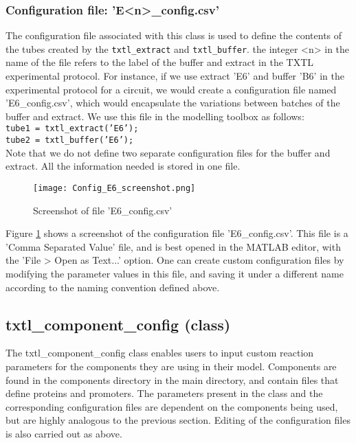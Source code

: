 		\subsubsection*{Configuration file: \textsf{'E<n>\_config.csv'}}
		The configuration file associated with this class is used to define the contents of the tubes created by the \texttt{txtl\_extract} and \texttt{txtl\_buffer}. the integer <n> in the name of the file refers to the label of the buffer and extract in the TXTL experimental protocol. For instance, if we use extract \textsf{'E6'} and buffer \textsf{'B6'} in the experimental protocol for a circuit, we would create a configuration file named \textsf{'E6\_config.csv'}, which would encapsulate the variations between batches of the buffer and extract.  We use this file in the modelling toolbox as follows: \\
		
		\noindent \texttt{tube1 = txtl\_extract('E6');} \\
		\texttt{tube2 = txtl\_buffer('E6');} \\
		
Note that we do not define two separate configuration files for the buffer and extract. All the information needed is stored in one file. \\

		\begin{figure}
		\begin{center}
		\texttt{[image: Config\_E6\_screenshot.png]} 
		\caption{Screenshot of file 'E6\_config.csv'}
		\label{fig:reactionconfig}
		\end{center}
		\end{figure}

Figure \ref{fig:reactionconfig} shows a screenshot of the configuration file \textsf{'E6\_config.csv'}. This file is a 'Comma Separated Value' file, and is best opened in the MATLAB editor, with the 'File > Open as Text...' option. One can create custom configuration files by modifying the parameter values in this file, and saving it under a different name according to the naming convention defined above. 

		\subsection*{txtl\_component\_config (class)}	
		The txtl\_component\_config class enables users to input custom reaction parameters for the components they are using in their model. Components are found in the \textsf{components} directory in the main directory, and contain files that define proteins and promoters. The parameters present in the class and the corresponding configuration files are dependent on the components being used, but are highly analogous to the previous section. Editing of the configuration files is also carried out as above. 

